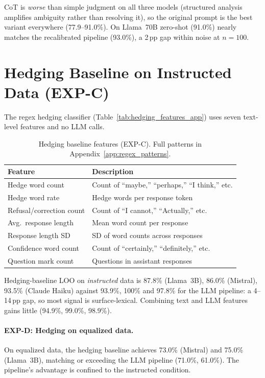CoT is \emph{worse} than simple judgment on all three models (structured analysis amplifies ambiguity rather than resolving it), so the original prompt is the best variant everywhere (77.9--91.0\%). On Llama~70B zero-shot (91.0\%) nearly matches the recalibrated pipeline (93.0\%), a 2\,pp gap within noise at $n=100$.

\section{Hedging Baseline on Instructed Data (EXP-C)}
\label{app:hedging_instructed}

The regex hedging classifier (Table~\ref{tab:hedging_features_app}) uses seven text-level features and no LLM calls.

\begin{table}[h]
\centering
\caption{Hedging baseline features (EXP-C). Full patterns in Appendix~\ref{app:regex_patterns}.}
\label{tab:hedging_features_app}
\label{tab:hedging_features}
\begin{tabular}{ll}
\toprule
\textbf{Feature} & \textbf{Description} \\
\midrule
Hedge word count     & Count of ``maybe,'' ``perhaps,'' ``I think,'' etc. \\
Hedge word rate      & Hedge words per response token \\
Refusal/correction count & Count of ``I cannot,'' ``Actually,'' etc. \\
Avg.\ response length  & Mean word count per response \\
Response length SD   & SD of word counts across responses \\
Confidence word count & Count of ``certainly,'' ``definitely,'' etc. \\
Question mark count  & Questions in assistant responses \\
\bottomrule
\end{tabular}
\end{table}

Hedging-baseline LOO on \emph{instructed} data is 87.8\% (Llama~3B), 86.0\% (Mistral), 93.5\% (Claude Haiku) against 93.9\%, 100\% and 97.8\% for the LLM pipeline: a 4--14\,pp gap, so most signal is surface-lexical. Combining text and LLM features gains little (94.9\%, 99.0\%, 98.9\%).

\paragraph{EXP-D: Hedging on equalized data.} On equalized data, the hedging baseline achieves 73.0\% (Mistral) and 75.0\% (Llama~3B), matching or exceeding the LLM pipeline (71.0\%, 61.0\%). The pipeline's advantage is confined to the instructed condition.

